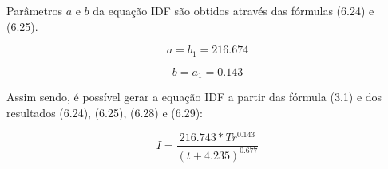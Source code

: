 \newpage

Parâmetros $a$ e $b$ da equação IDF são obtidos através das fórmulas (6.24) e (6.25).\bigskip

\begin{equation}
a = b_1 = 216.674
\end{equation}

\begin{equation}
b = a_1 = 0.143
\end{equation}\bigskip

Assim sendo, é possível gerar a equação IDF a partir das fórmula (3.1) e dos resultados (6.24), (6.25), (6.28) e (6.29):\bigskip

\begin{equation}
I = \frac{216.743 * Tr^{0.143}}{(t + 4.235)^{0.677}}
\end{equation}\bigskip
